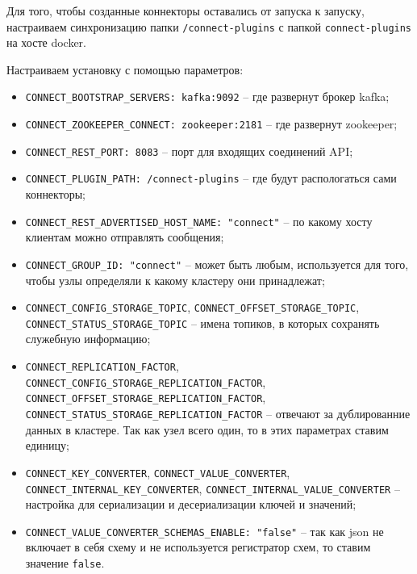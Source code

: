 Для того, чтобы созданные коннекторы оставались от запуска к запуску,
настраиваем синхронизацию папки \verb|/connect-plugins| с папкой
\verb|connect-plugins| на хосте docker.

Настраиваем установку с помощью параметров:
\begin{itemize}
    \item \verb|CONNECT_BOOTSTRAP_SERVERS: kafka:9092| -- где развернут брокер kafka;
    \item \verb|CONNECT_ZOOKEEPER_CONNECT: zookeeper:2181| -- где развернут zookeeper;
    \item \verb|CONNECT_REST_PORT: 8083| -- порт для входящих соединений API;
    \item \verb|CONNECT_PLUGIN_PATH: /connect-plugins| -- где будут
        распологаться сами коннекторы; 
    \item \verb|CONNECT_REST_ADVERTISED_HOST_NAME: "connect"| -- по какому хосту
        клиентам можно отправлять сообщения;
    \item \verb|CONNECT_GROUP_ID: "connect"| -- может быть любым, используется
        для того, чтобы узлы определяли к какому кластеру они принадлежат;
    \item \verb|CONNECT_CONFIG_STORAGE_TOPIC|,
        \verb|CONNECT_OFFSET_STORAGE_TOPIC|, \verb|CONNECT_STATUS_STORAGE_TOPIC|
        -- имена топиков, в которых сохранять служебную информацию;
    \item \verb|CONNECT_REPLICATION_FACTOR|,\\
        \verb|CONNECT_CONFIG_STORAGE_REPLICATION_FACTOR|,
        \verb|CONNECT_OFFSET_STORAGE_REPLICATION_FACTOR|,
        \verb|CONNECT_STATUS_STORAGE_REPLICATION_FACTOR| -- отвечают за
        дублированние данных в кластере. Так как узел всего один, то в этих
        параметрах ставим единицу;
    \item \verb|CONNECT_KEY_CONVERTER|, \verb|CONNECT_VALUE_CONVERTER|,
        \verb|CONNECT_INTERNAL_KEY_CONVERTER|,
        \verb|CONNECT_INTERNAL_VALUE_CONVERTER| -- настройка для сериализации и
        десериализации ключей и значений;
    \item \verb|CONNECT_VALUE_CONVERTER_SCHEMAS_ENABLE: "false"| -- так как json
        не включает в себя схему и не используется регистратор схем, то ставим
        значение \verb|false|.
\end{itemize}

